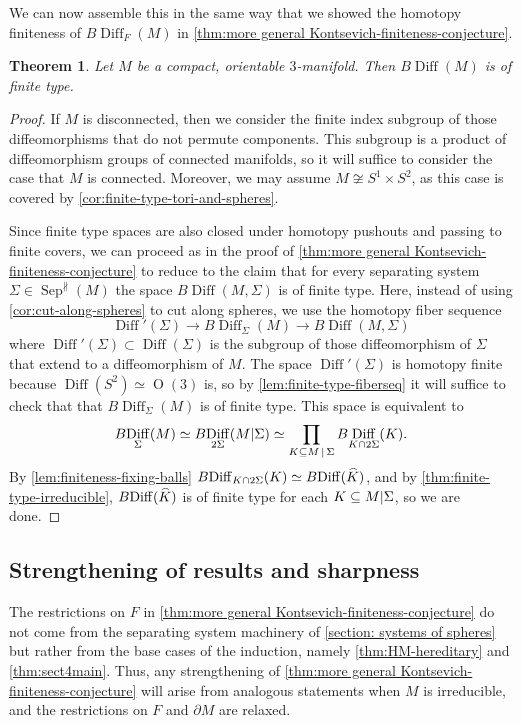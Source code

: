 \documentclass{amsart}
\theoremstyle{plain}
\newtheorem{thm}{Theorem}[section]
\theoremstyle{definition}
\DeclareMathOperator\Diff{Diff}
\DeclareMathOperator\Or{O}
\newcommand{\scl}[1]{\smash{\widehat{#1}}} %
\DeclareMathOperator\sep{Sep} %
\newcommand{\sepNP}{\sep^{\nparallel}} %
\newcommand{\ca}{\smash{\mid}} %
\newcommand{\BDiff}{B\!\Diff}
\begin{document}
We can now assemble this in the same way that we showed the homotopy finiteness of $\BDiff_F(M)$ in \cref{thm:more general Kontsevich-finiteness-conjecture}.
\begin{thm}\label{thm:finite-type}
    Let $M$ be a compact, orientable $3$-manifold.
    Then $\BDiff(M)$ is of finite type.
\end{thm}
\begin{proof}
    If $M$ is disconnected, then we consider the finite index subgroup of those diffeomorphisms that do not permute components.
    This subgroup is a product of diffeomorphism groups of connected manifolds, so it will suffice to consider the case that $M$ is connected.
    Moreover, we may assume $M \not\cong S^1 \times S^2$, as this case is covered by \cref{cor:finite-type-tori-and-spheres}.
    
    Since finite type spaces are also closed under homotopy pushouts and passing to finite covers, we can proceed as in the proof of \cref{thm:more general Kontsevich-finiteness-conjecture} to reduce to the claim that for every separating system $\Sigma \in \sepNP(M)$ the space $\BDiff(M, \Sigma)$ is of finite type.
    Here, instead of using \cref{cor:cut-along-spheres} to cut along spheres, we use the homotopy fiber sequence
    \[
        \Diff'(\Sigma) \longrightarrow
        \BDiff_\Sigma(M) \longrightarrow 
        \BDiff(M, \Sigma)
    \]
    where $\Diff'(\Sigma) \subset \Diff(\Sigma)$ is the subgroup of those diffeomorphism of $\Sigma$ that extend to a diffeomorphism of $M$.
    The space $\Diff'(\Sigma)$ is homotopy finite because $\Diff(S^2) \simeq \Or(3)$ is, so by \cref{lem:finite-type-fiberseq} it will suffice to check that that $\BDiff_\Sigma(M)$ is of finite type.
    This space is equivalent to
    \[
        \BDiff_\Sigma(M) \simeq \BDiff_{2\Sigma}(M \ca \Sigma)
        \simeq \prod_{K \subseteq M \,\ca \,\Sigma} \BDiff_{K \cap 2\Sigma}(K).
    \]
    By \cref{lem:finiteness-fixing-balls} $\BDiff_{K \cap 2\Sigma}(K)\simeq \BDiff(\scl{K})$, and by \cref{thm:finite-type-irreducible}, $\BDiff(\scl{K})$ is of finite type for each $K\subseteq M\ca \Sigma$, so we are done.
\end{proof}



\subsection{Strengthening of results and sharpness}
\label{subsection - sharpness}
The restrictions on $F$ in \cref{thm:more general Kontsevich-finiteness-conjecture} do not come from the separating system machinery of \cref{section: systems of spheres} but rather from the base cases of the induction, namely \cref{thm:HM-hereditary} and \cref{thm:sect4main}. Thus, any strengthening of \cref{thm:more general Kontsevich-finiteness-conjecture} will arise from analogous statements when $M$ is irreducible, and the restrictions on $F$ and $\partial M$ are relaxed. 
\end{document}

